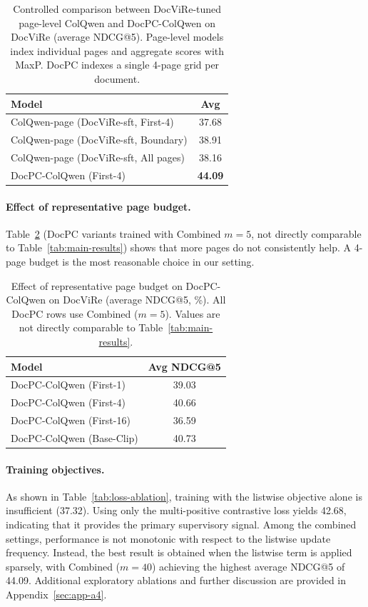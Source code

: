 \begin{table}[H]
  \centering
  \small
  \caption{Controlled comparison between DocViRe-tuned page-level ColQwen and DocPC-ColQwen on DocViRe (average NDCG@5).
  Page-level models index individual pages and aggregate scores with MaxP. DocPC indexes a single 4-page grid per document.}
  \label{tab:controlled-page}
  \begin{tabular}{@{}lc@{}}
    \toprule
    Model & Avg \\
    \midrule
    ColQwen-page (DocViRe-sft, First-4)  & 37.68 \\
    ColQwen-page (DocViRe-sft, Boundary) & 38.91 \\
    ColQwen-page (DocViRe-sft, All pages) & 38.16 \\
    DocPC-ColQwen (First-4)                     & \textbf{44.09} \\
    \bottomrule
  \end{tabular}
\end{table}

\paragraph{Effect of representative page budget.}
Table~\ref{tab:page-budget} (DocPC variants trained with Combined $m{=}5$, not directly comparable to Table~\ref{tab:main-results}) shows that more pages do not consistently help. A 4-page budget is the most reasonable choice in our setting.

\begin{table}[H]
  \centering
  \small
  \caption{Effect of representative page budget on DocPC-ColQwen on DocViRe (average NDCG@5, \%). All DocPC rows use Combined ($m{=}5$). Values are not directly comparable to Table~\ref{tab:main-results}.}
  \label{tab:page-budget}
  \begin{tabular}{@{}lc@{}}
    \toprule
    Model & Avg NDCG@5 \\
    \midrule
    DocPC-ColQwen (First-1) & 39.03 \\
    DocPC-ColQwen (First-4) & 40.66 \\
    DocPC-ColQwen (First-16) & 36.59 \\
    DocPC-ColQwen (Base-Clip) & 40.73 \\
    \bottomrule
  \end{tabular}
\end{table}

\paragraph{Training objectives.}
As shown in Table~\ref{tab:loss-ablation}, training with the listwise objective alone is insufficient (37.32). Using only the multi-positive contrastive loss yields 42.68, indicating that it provides the primary supervisory signal. Among the combined settings, performance is not monotonic with respect to the listwise update frequency. Instead, the best result is obtained when the listwise term is applied sparsely, with Combined ($m{=}40$) achieving the highest average NDCG@5 of 44.09. Additional exploratory ablations and further discussion are provided in Appendix~\ref{sec:app-a4}.

